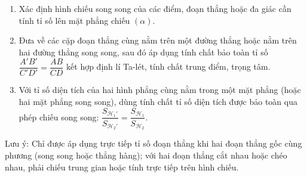 \begin{enumerate}
\item Xác định hình chiếu song song của các điểm, đoạn thẳng hoặc đa giác cần tính tỉ số lên mặt phẳng chiếu $(\alpha)$.
\item Đưa về các cặp đoạn thẳng cùng nằm trên một đường thẳng hoặc nằm trên hai đường thẳng song song, sau đó áp dụng tính chất bảo toàn tỉ số $\dfrac{A'B'}{C'D'} = \dfrac{AB}{CD}$ kết hợp định lí Ta-lét, tính chất trung điểm, trọng tâm.
\item Với tỉ số diện tích của hai hình phẳng cùng nằm trong một mặt phẳng (hoặc hai mặt phẳng song song), dùng tính chất tỉ số diện tích được bảo toàn qua phép chiếu song song: $\boxed{\dfrac{S_{\mathcal{H}_1'}}{S_{\mathcal{H}_2'}} = \dfrac{S_{\mathcal{H}_1}}{S_{\mathcal{H}_2}}}$.
\end{enumerate}
Lưu ý: Chỉ được áp dụng trực tiếp tỉ số đoạn thẳng khi hai đoạn thẳng gốc cùng phương (song song hoặc thẳng hàng); với hai đoạn thẳng cắt nhau hoặc chéo nhau, phải chiếu trung gian hoặc tính trực tiếp trên hình chiếu.
